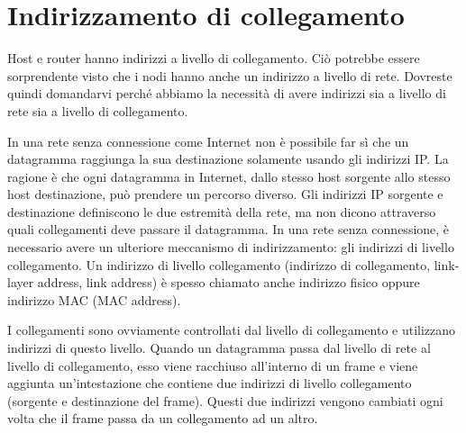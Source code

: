 \section{Indirizzamento di collegamento}
Host e router hanno indirizzi a livello di collegamento. Ciò potrebbe essere  sorprendente visto che i nodi hanno anche un indirizzo a livello di rete.  Dovreste quindi domandarvi perché abbiamo la necessità di avere indirizzi sia a livello di rete sia a livello di collegamento.

In una rete senza connessione come Internet non è possibile far sì che un datagramma raggiunga la sua destinazione solamente usando gli indirizzi IP. La ragione è che ogni datagramma in Internet, dallo stesso host sorgente allo stesso host destinazione, può prendere un percorso diverso. Gli indirizzi IP sorgente e destinazione definiscono le due estremità della rete, ma non dicono attraverso quali collegamenti deve passare il datagramma. In una rete senza connessione, è necessario avere un ulteriore meccanismo di indirizzamento: gli indirizzi di livello collegamento. Un indirizzo di livello collegamento (indirizzo di collegamento, link-layer address, link address) è spesso chiamato anche indirizzo fisico oppure indirizzo MAC (MAC address).

I collegamenti sono ovviamente controllati dal livello di collegamento e utilizzano indirizzi di questo livello. Quando un datagramma passa dal livello di rete al livello di collegamento, esso viene racchiuso all'interno di un frame e viene aggiunta un'intestazione che contiene due indirizzi di livello collegamento (sorgente e destinazione del frame). Questi due indirizzi vengono cambiati ogni volta che il frame passa da un collegamento ad un altro.

